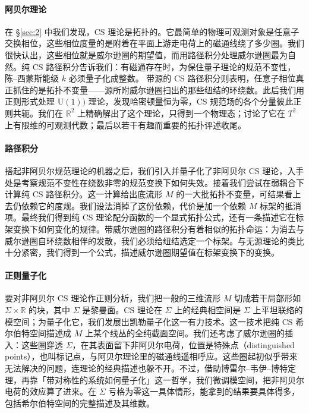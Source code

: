 \documentclass[11pt,a4paper]{article}
\newcommand{\R}{\mathbb{R}}
\begin{document}
\paragraph{阿贝尔理论}
在 \S\ref{sec:2} 中我们发现，CS 理论是拓扑的。它最简单的物理可观测对象是任意子交换相位，这些相位度量的是附着在平面上游走电荷上的磁通线绕了多少圈。我们很快认出，这些相位就是威尔逊圈的期望值，而用路径积分处理威尔逊圈最为自然。纯 CS 路径积分告诉我们：有磁通存在时，为保住量子理论的规范不变性，陈--西蒙斯能级 $k$ 必须量子化成整数。
带源的 CS 路径积分则表明，任意子相位真正抓住的是拓扑不变量——源所附威尔逊圈扫出的那些纽结的环绕数。此后我们用正则形式处理 $\mathrm{U}(1))$ 理论，发现哈密顿量恒为零，CS 规范场的各个分量彼此正则共轭。我们在 $\R^2$ 上精确解出了这个理论，只得到一个物理态；讨论了它在 $T^2$ 上有限维的可观测代数；最后以若干有趣而重要的拓扑评述收尾。

\paragraph{路径积分}
搭起非阿贝尔规范理论的机器之后，我们引入并量子化了非阿贝尔 CS 理论，入手处是考察规范不变性在绕数非零的规范变换下如何失效。接着我们尝试在弱耦合下计算纯 CS 路径积分。这一计算给出底流形 $M$ 的一大批拓扑不变量，可结果看上去仍依赖它的度规。我们设法消掉了这份依赖，代价是加一个依赖 $M$ 标架的抵消项。最终我们得到纯 CS 理论配分函数的一个显式拓扑公式，还有一条描述它在标架变换下如何变化的规律。带威尔逊圈的路径积分有着相似的拓扑命运：为消去与威尔逊圈自环绕数相伴的发散，我们必须给纽结选定一个标架。与无源理论的类比十分紧密，我们得到一个公式，描述威尔逊圈期望值在标架变换下的变换。

\paragraph{正则量子化}
要对非阿贝尔 CS 理论作正则分析，我们把一般的三维流形 $M$ 切成若干局部形如 $\Sigma\times\R$ 的块，其中 $\Sigma$ 是黎曼面。CS 理论在 $\Sigma$ 上的经典相空间是 $\Sigma$ 上平坦联络的模空间；为量子化它，我们发展出凯勒量子化这一有力技术。这一技术把纯 CS 希尔伯特空间描述成 $M$ 上某个线丛的全纯截面空间。我们还考虑了威尔逊圈的插入：这些圈穿透 $\Sigma$，在其表面留下非阿贝尔电荷，位置是特殊点（distinguished points），也叫标记点，与阿贝尔理论里的磁通线遥相呼应。这些圈起初似乎带来无法解决的问题，连理论的经典描述也躲不开。不过，借助博雷尔--韦伊--博特定理，再靠「带对称性的系统如何量子化」这一哲学，我们微调模空间，把非阿贝尔电荷的效应算了进来。在 $\Sigma$ 亏格为零这一具体情形，能拿到的结果要具体得多，包括希尔伯特空间的完整描述及其维数。
\end{document}
